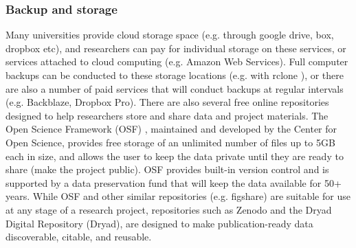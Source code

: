 \documentclass[10pt,letterpaper]{article}
\begin{document}
\subsubsection*{Backup and storage} 
Many universities provide cloud storage space (e.g. through google drive, box, dropbox etc), and researchers can pay for individual storage on these services, or services attached to cloud computing (e.g. Amazon Web Services). 
Full computer backups can be conducted to these storage locations (e.g. with rclone \cite{bailleul2016rclone}), or there are also a number of paid services that will conduct backups at regular intervals (e.g. Backblaze, Dropbox Pro). 
There are also several free online repositories designed to help researchers store and share data and project materials. 
The Open Science Framework (OSF) \cite{foster2017open}, maintained and developed by the Center for Open Science, provides free storage of an unlimited number of files up to 5GB each in size, and allows the user to keep the data private until they are ready to share (make the project public). 
OSF provides built-in version control and is supported by a data preservation fund that will keep the data available for 50+ years. 
While OSF and other similar repositories (e.g. figshare) are suitable for use at any stage of a research project, repositories such as Zenodo and the Dryad Digital Repository (Dryad), are designed to make publication-ready data discoverable, citable, and reusable. 


\end{document}
